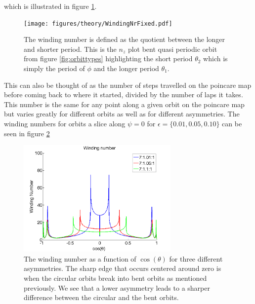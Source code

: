 which is illustrated in figure \ref{fig:windingDef}.

\begin{figure}[H]
\begin{center}
\texttt{[image: figures/theory/WindingNrFixed.pdf]}
\end{center}
\caption{The winding number is defined as the quotient between the longer and shorter period. This is the $n_z$ plot bent quasi periodic orbit from figure \ref{fig:orbittypes} highlighting the short period $\theta_2$ which is simply the period of $\phi$ and the longer period $\theta_1$.}
\label{fig:windingDef}
\end{figure}

This can also be thought of as the number of steps travelled on the poincare map before coming back to where it 
started, divided by the number of laps it takes. This number is the same for any point along a given orbit on the 
poincare map but varies greatly for different orbits as well as for different asymmetries. The winding numbers for
 orbits a slice along $\psi=0$ for $\epsilon=\{0.01, 0.05, 0.10\}$ can be seen in figure \ref{fig:windingdifferent}
 
\begin{figure}[H]
\begin{center}
\includegraphics[width=0.7\textwidth]{figures/theory/WindingTrend.png}
\end{center}
\caption{The winding number as a function of $\cos(\theta)$ for three different asymmetries. The sharp edge that occurs centered around zero is when the circular orbits break into bent orbits as mentioned previously. We see that a lower asymmetry leads to a sharper difference between the circular and the bent orbits.}
\label{fig:windingdifferent}
\end{figure}
